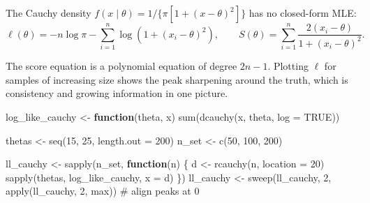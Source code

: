 \documentclass[
  letterpaper,
  DIV=11,
  numbers=noendperiod]{scrreprt}
\newenvironment{Shaded}{\begin{snugshade}}{\end{snugshade}}
\newcommand{\AttributeTok}[1]{\textcolor[rgb]{0.40,0.45,0.13}{#1}}
\newcommand{\CommentTok}[1]{\textcolor[rgb]{0.37,0.37,0.37}{#1}}
\newcommand{\ConstantTok}[1]{\textcolor[rgb]{0.56,0.35,0.01}{#1}}
\newcommand{\ControlFlowTok}[1]{\textcolor[rgb]{0.00,0.23,0.31}{\textbf{#1}}}
\newcommand{\DecValTok}[1]{\textcolor[rgb]{0.68,0.00,0.00}{#1}}
\newcommand{\FunctionTok}[1]{\textcolor[rgb]{0.28,0.35,0.67}{#1}}
\newcommand{\NormalTok}[1]{\textcolor[rgb]{0.00,0.23,0.31}{#1}}
\newcommand{\OtherTok}[1]{\textcolor[rgb]{0.00,0.23,0.31}{#1}}
\begin{document}
The Cauchy density \(f(x \mid \theta) = 1/\{\pi[1 + (x - \theta)^2]\}\)
has no closed-form MLE:
\[\ell(\theta) = -n\log\pi - \sum_{i=1}^{n}\log\left(1 + (x_i - \theta)^{2}\right), \qquad
S(\theta) = \sum_{i=1}^{n}\frac{2(x_i - \theta)}{1 + (x_i - \theta)^{2}} .\]

The score equation is a polynomial equation of degree \(2n - 1\).
Plotting \(\ell\) for samples of increasing size shows the peak
sharpening around the truth, which is consistency and growing
information in one picture.

\begin{Shaded}
\begin{Highlighting}[]
\NormalTok{log\_like\_cauchy }\OtherTok{\textless{}{-}} \ControlFlowTok{function}\NormalTok{(theta, x) }\FunctionTok{sum}\NormalTok{(}\FunctionTok{dcauchy}\NormalTok{(x, theta, }\AttributeTok{log =} \ConstantTok{TRUE}\NormalTok{))}

\NormalTok{thetas }\OtherTok{\textless{}{-}} \FunctionTok{seq}\NormalTok{(}\DecValTok{15}\NormalTok{, }\DecValTok{25}\NormalTok{, }\AttributeTok{length.out =} \DecValTok{200}\NormalTok{)}
\NormalTok{n\_set }\OtherTok{\textless{}{-}} \FunctionTok{c}\NormalTok{(}\DecValTok{50}\NormalTok{, }\DecValTok{100}\NormalTok{, }\DecValTok{200}\NormalTok{)}

\NormalTok{ll\_cauchy }\OtherTok{\textless{}{-}} \FunctionTok{sapply}\NormalTok{(n\_set, }\ControlFlowTok{function}\NormalTok{(n) \{}
\NormalTok{  d }\OtherTok{\textless{}{-}} \FunctionTok{rcauchy}\NormalTok{(n, }\AttributeTok{location =} \DecValTok{20}\NormalTok{)}
  \FunctionTok{sapply}\NormalTok{(thetas, log\_like\_cauchy, }\AttributeTok{x =}\NormalTok{ d)}
\NormalTok{\})}
\NormalTok{ll\_cauchy }\OtherTok{\textless{}{-}} \FunctionTok{sweep}\NormalTok{(ll\_cauchy, }\DecValTok{2}\NormalTok{, }\FunctionTok{apply}\NormalTok{(ll\_cauchy, }\DecValTok{2}\NormalTok{, max))   }\CommentTok{\# align peaks at 0}


\end{Highlighting}
\end{Shaded}
\end{document}
